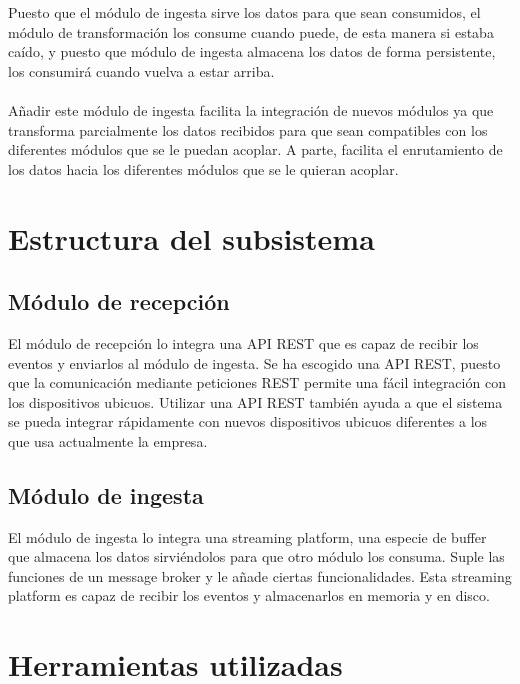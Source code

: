 
Puesto que el módulo de ingesta sirve los datos para que sean consumidos, el módulo de transformación los consume cuando puede, de esta manera si estaba caído, y puesto que módulo de ingesta almacena los datos de forma persistente, los consumirá cuando vuelva a estar arriba.
\\\\
Añadir este módulo de ingesta facilita la integración de nuevos módulos ya que transforma parcialmente los datos recibidos para que sean compatibles con los diferentes módulos que se le puedan acoplar. A parte, facilita el enrutamiento de los datos hacia los diferentes módulos que se le quieran acoplar. 



\section{Estructura del subsistema}

\subsection{Módulo de recepción}
El módulo de recepción lo integra una API REST que es capaz de recibir los eventos y enviarlos al módulo de ingesta. Se ha escogido una API REST, puesto que la comunicación mediante peticiones REST permite una fácil integración con los dispositivos ubicuos. Utilizar una API REST también ayuda a que el sistema se pueda integrar rápidamente con nuevos dispositivos ubicuos diferentes a los que usa actualmente la empresa.

\subsection{Módulo de ingesta}
El módulo de ingesta lo integra una streaming platform, una especie de buffer que almacena los datos sirviéndolos para que otro módulo los consuma. Suple las funciones de un message broker\cite{Tfg:messagebroker} y le añade ciertas funcionalidades. Esta streaming platform es capaz de recibir los eventos y almacenarlos en memoria y en disco.


\section{Herramientas utilizadas}

